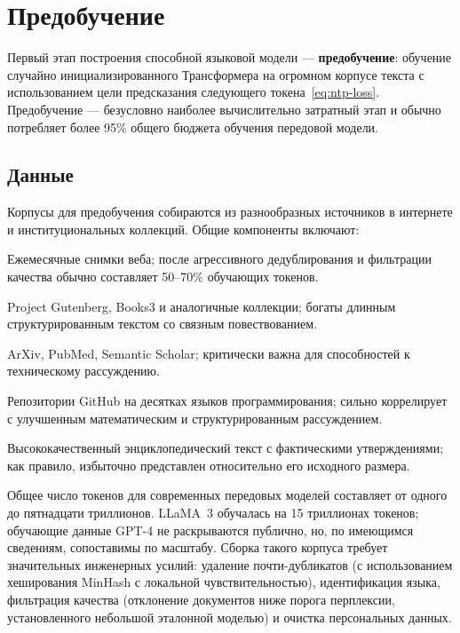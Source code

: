 \section{Предобучение}
\label{sec:pretraining}

Первый этап построения способной языковой модели --- \textbf{предобучение}: обучение случайно инициализированного Трансформера на огромном корпусе текста с использованием цели предсказания следующего токена~\eqref{eq:ntp-loss}. Предобучение --- безусловно наиболее вычислительно затратный этап и обычно потребляет более 95\% общего бюджета обучения передовой модели.

\subsection{Данные}

Корпусы для предобучения собираются из разнообразных источников в интернете и институциональных коллекций. Общие компоненты включают:

\begin{description}[leftmargin=!, labelwidth=3.5cm]
  \item[Common Crawl] Ежемесячные снимки веба; после агрессивного дедублирования и фильтрации качества обычно составляет 50--70\% обучающих токенов.
  \item[Книги] Project Gutenberg, Books3 и аналогичные коллекции; богаты длинным структурированным текстом со связным повествованием.
  \item[Научная литература] ArXiv, PubMed, Semantic Scholar; критически важна для способностей к техническому рассуждению.
  \item[Код] Репозитории GitHub на десятках языков программирования; сильно коррелирует с улучшенным математическим и структурированным рассуждением.
  \item[Википедия и Викиданные] Высококачественный энциклопедический текст с фактическими утверждениями; как правило, избыточно представлен относительно его исходного размера.
\end{description}

Общее число токенов для современных передовых моделей составляет от одного до пятнадцати триллионов. LLaMA~3 обучалась на 15 триллионах токенов; обучающие данные GPT-4 не раскрываются публично, но, по имеющимся сведениям, сопоставимы по масштабу. Сборка такого корпуса требует значительных инженерных усилий: удаление почти-дубликатов (с использованием хеширования MinHash с локальной чувствительностью), идентификация языка, фильтрация качества (отклонение документов ниже порога перплексии, установленного небольшой эталонной моделью) и очистка персональных данных.


